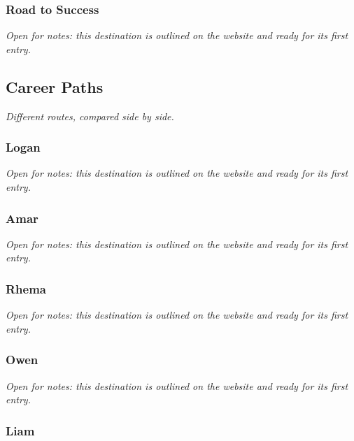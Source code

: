 \documentclass{article}
\begin{document}
\subsubsection{Road to Success}\label{sec:road-to-success}
\textit{Open for notes: this destination is outlined on the website and ready for its first entry.}

\subsection{Career Paths}\label{sec:career-paths}
\textit{Different routes, compared side by side.}

\subsubsection{Logan}\label{sec:logan}
\textit{Open for notes: this destination is outlined on the website and ready for its first entry.}

\subsubsection{Amar}\label{sec:amar}
\textit{Open for notes: this destination is outlined on the website and ready for its first entry.}

\subsubsection{Rhema}\label{sec:rhema}
\textit{Open for notes: this destination is outlined on the website and ready for its first entry.}

\subsubsection{Owen}\label{sec:owen}
\textit{Open for notes: this destination is outlined on the website and ready for its first entry.}

\subsubsection{Liam}\label{sec:liam}
\end{document}
